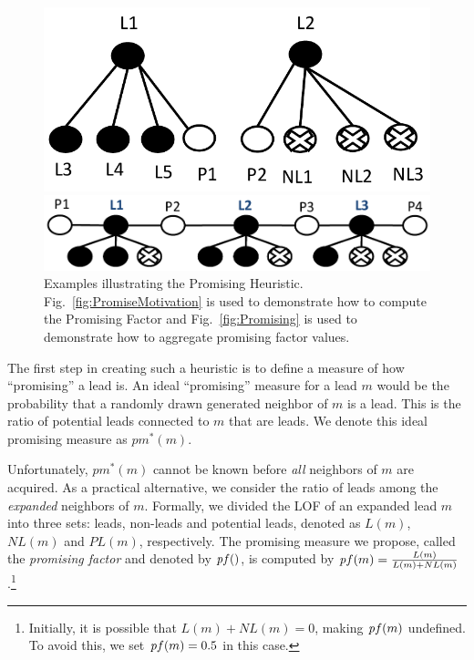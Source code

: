 \documentclass[journal]{IEEEtran}
\newcommand{\pf}{{\textit pf}}
\begin{document}
\begin{figure}
\centering
\begin{subfloat}[\label{fig:PromiseMotivation}]
  \centering
  \includegraphics[width=0.75\linewidth]{PromiseMotivation.pdf}
\end{subfloat}
\begin{subfloat}[\label{fig:Promising}]
  \centering
  \includegraphics[width=0.95\linewidth]{bysp-good_cropped.pdf}
\end{subfloat}
\caption{Examples illustrating the Promising Heuristic. Fig.~\ref{fig:PromiseMotivation} is used to demonstrate how to compute the Promising Factor and Fig.~\ref{fig:Promising} is used to demonstrate how to aggregate promising factor values. }
\end{figure}

The first step in creating such a heuristic is to define a measure of how ``promising'' a lead is. An ideal ``promising'' measure for a lead $m$ would be the probability that a randomly drawn generated neighbor of $m$ is a lead. This is the ratio of potential leads connected to $m$ that are leads. We denote this ideal promising measure as $pm^*(m)$.

Unfortunately, $pm^*(m)$ cannot be known before {\em all} neighbors of $m$ are acquired. As a practical alternative, we consider the ratio of leads among the {\em expanded} neighbors of $m$. Formally, we divided the LOF of an expanded lead $m$ into three sets: leads, non-leads and potential leads, denoted as $L(m)$, $NL(m)$ and $PL(m)$, respectively. The promising measure we propose, called the {\em promising factor} and denoted by $\pf()$, is computed by $\pf(m)=\frac{L(m)}{L(m)+NL(m)}$.\footnote{Initially, it is possible that $L(m)+NL(m)=0$, making $\pf(m)$ undefined. To avoid this, we set $\pf(m)=0.5$ in this case.}
\end{document}
